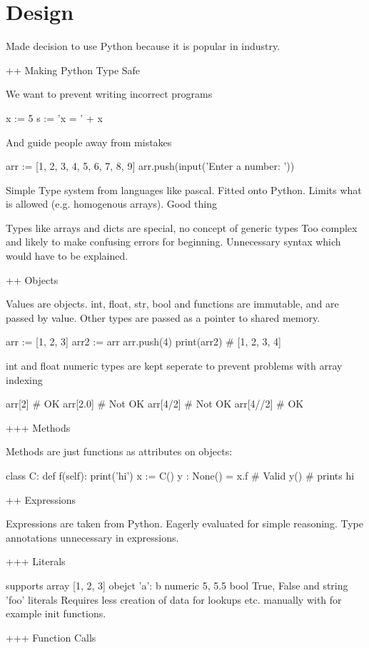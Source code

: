 \glsresetall %
\chapter{Design}\label{ch:Design}

Made decision to use Python because it is popular in industry.


++ Making Python Type Safe

We want to prevent writing incorrect programs

x := 5
s := 'x = ' + x

And guide people away from mistakes

arr := [1, 2, 3, 4, 5, 6, 7, 8, 9]
arr.push(input('Enter a number: '))

Simple Type system from languages like pascal.  Fitted onto Python.
Limits what is allowed (e.g. homogenous arrays). Good thing

Types like arrays and dicts are special, no concept of generic types
Too complex and likely to make confusing errors for beginning. Unnecessary syntax which would have to be explained.


++ Objects

Values are objects. int, float, str, bool and functions are immutable, and are passed by value.
Other types are passed as a pointer to shared memory.

arr := [1, 2, 3]
arr2 := arr
arr.push(4)
print(arr2) # [1, 2, 3, 4]

int and float numeric types are kept seperate to prevent problems with array indexing

arr[2] # OK
arr[2.0] # Not OK
arr[4/2] # Not OK
arr[4//2] # OK

+++ Methods

Methods are just functions as attributes on objects:

class C:
    def f(self): print('hi')
x := C()
y : None() = x.f # Valid
y() # prints hi

++ Expressions

Expressions are taken from Python. Eagerly evaluated for simple reasoning.
Type annotations unnecessary in expressions.

+++ Literals

supports array [1, 2, 3] obejct {'a': b} numeric 5, 5.5 bool True, False and string 'foo' literals
Requires less creation of data for lookups etc. manually with for example init functions.

+++ Function Calls

